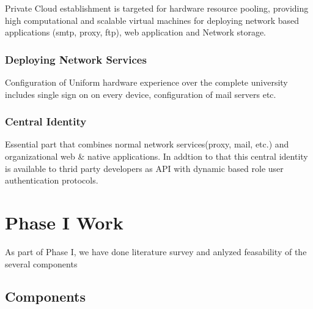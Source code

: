 \documentclass[12pt]{report}
\begin{document}
	Private Cloud establishment is targeted for hardware resource pooling, providing high computational and scalable virtual machines for deploying network based applications (smtp, proxy, ftp), web application and Network storage.
	
\subsection{Deploying Network Services}

	Configuration of Uniform hardware experience over the complete university includes single sign on on every device, configuration of mail servers etc.
	
\subsection{Central Identity}

	Essential part that combines normal network services(proxy, mail, etc.) and organizational web \& native applications. In addtion to that this central identity is available to thrid party developers as API with dynamic based role user authentication protocols.	
	
\chapter{Phase I Work}

	As part of Phase I, we have done literature survey and anlyzed feasability of the several components
	
\section{Components}
\end{document}

